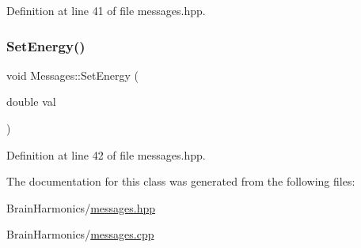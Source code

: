Definition at line 41 of file messages.\+hpp.

\mbox{\label{class_messages_a522996f78812e3a01e68214385db2cfd}} 
\subsubsection{\texorpdfstring{Set\+Energy()}{SetEnergy()}}
{\footnotesize\ttfamily void Messages\+::\+Set\+Energy (\begin{DoxyParamCaption}\item[{double}]{val }\end{DoxyParamCaption})\hspace{0.3cm}{\ttfamily [inline]}}



Definition at line 42 of file messages.\+hpp.



The documentation for this class was generated from the following files\+:\begin{DoxyCompactItemize}
\item 
Brain\+Harmonics/\hyperlink{messages_8hpp}{messages.\+hpp}\item 
Brain\+Harmonics/\hyperlink{messages_8cpp}{messages.\+cpp}\end{DoxyCompactItemize}

